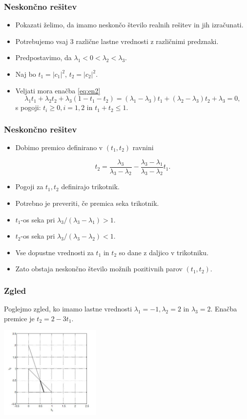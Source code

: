 \documentclass{beamer}
\newcommand{\abs}[1]{ \left\lvert#1\right\rvert}
\begin{document}
\begin{frame}
\frametitle{Neskončno rešitev}
\begin{itemize}
\item Pokazati želimo, da imamo neskončo število realnih rešitev in jih izračunati. \pause
\item Potrebujemo vsaj 3 različne lastne vrednosti z različnimi predznaki.\pause
\item Predpostavimo, da $\lambda_1 <0<\lambda_2<\lambda_3$.\pause
\item Naj bo $t_1=\abs{c_1}^2$, $t_2=\abs{c_2}^2$.\pause
\item Veljati mora enačba \eqref{eq:en2}
\begin{equation*}%
\lambda_1 t_1 +\lambda_2 t_2 +\lambda_3 (1- t_1 -t_2)=(\lambda_1 -\lambda_3)t_1 +(\lambda_2 -\lambda_3)t_2 +\lambda_3=0,
\end{equation*}
s pogoji: $t_i \ge 0, i=1,2$ in $t_1 +t_2\le1$.
\end{itemize}
\end{frame}
\begin{frame}
\frametitle{Neskončno rešitev}
\begin{itemize}
\item Dobimo premico definirano v $(t_1,t_2)$ ravnini 
\begin{block}{}
$$t_2=\frac{\lambda_3}{\lambda_3 - \lambda_2} -\frac{\lambda_3 -\lambda_1}{\lambda_3 -\lambda_2}t_1.$$
\end{block}\pause
\item Pogoji za $t_1,t_2$ definirajo trikotnik.
\item Potrebno je preveriti, če premica seka trikotnik.\pause
\item $t_1$-os seka pri $\lambda_3 /(\lambda_3 -\lambda_1)>1$.
\item $t_2$-os seka  pri $\lambda_3 /(\lambda_3 - \lambda_2)<1$.\pause
\item Vse dopustne vrednosti za $t_1$ in $t_2$ so dane z daljico v trikotniku. 
\item Zato obstaja neskončno število možnih pozitivnih parov $(t_1,t_2)$.
\end{itemize}
\end{frame}
\begin{frame}
\frametitle{Zgled}
Poglejmo zgled, ko imamo lastne vrednosti $\lambda_1=-1, \lambda_2=2$ in $\lambda_3=2$. Enačba premice je $t_2=2-3t_1$.
\begin{center}
\includegraphics[width=5cm]{trikotnik.jpg}
\end{center}
\end{frame}
\end{document}

